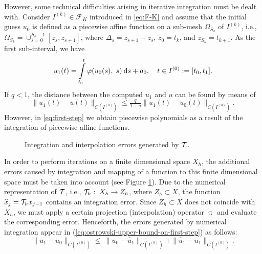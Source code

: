 However, some technical difficulties arising in iterative integration must be dealt 
with. Consider $I^{(k)} \in \mathcal{F}_K$ introduced in \eqref{eq:F-K} and assume that 
the initial guess $u_0$ is defined as a piecewise affine function on a sub-mesh 
$\Omega_{S_k}$ of $I^{(k)}$, i.e., \linebreak 
$\Omega_{S_k} = \cup_{s = 0}^{S_k \minus 1}[z_s, z_{s + 1}]$, where 
$\Delta_s = z_{s + 1} - z_s$, $z_0 = t_k$, and $z_{S_k} = t_{k+1}$. As the first 
sub-interval, we have
%
\begin{equation}
  u_1(t) = \Int_{t_0}^{t} \varphi(u_0(s),\;s) \ds+a_0,\quad t \in I^{(0)} := [t_0, t_1].
  \label{eq:first-step}
\end{equation}
%
If $q < 1$, the distance between the computed $u_1$ and $u$ can be found by means of 
%
\begin{equation}
   \|u_1(t) - u(t)\|_{C(I^{(0)})} \leq \tfrac{q}{1-q} \|u_1(t) - u_0(t)\|_{C(I^{(0)})}.
	\label{eq:ostrowski-upper-bound-on-first-step}
\end{equation}
%
However, in \eqref{eq:first-step} we obtain piecewise polynomials as a result of the 
integration of piecewise affine functions. 
%
\begin{figure}[th]
\begin{center}
	
	\caption{Integration and interpolation errors generated by $\mathcal{T}$.}
	\label{fig:integration-process}
\end{center}
\end{figure}
%
In order to perform iterations on a finite dimensional space $X_h$, the additional 
errors caused by integration and mapping of a function to this finite dimensional space 
must be taken into account (see Figure \ref{fig:integration-process}).
%
Due to the numerical representation of $\mathcal{T}$, i.e., $\mathcal{T}_h:\; X_h \rightarrow Z_h$, 
where $Z_h \subset X$, the function $\widehat{x}_j = \mathcal{T}_h x_{j-1}$ contains an 
integration error. Since $Z_h \subset X$ does not coincide with $X_h$, we must apply a 
certain projection (interpolation) operator $\uppi$ and evaluate the corresponding 
error. 
%
Henceforth, the errors generated by numerical integration appear in
(\ref{eq:ostrowski-upper-bound-on-first-step}) as follows:
%
\begin{equation}
      \|u_1 - u_0\|_{C(I^{(0)})} \leq
            \:\|u_0 - \widehat{u}_1\|_{C(I^{(0)})}
						+ \|\widehat{u}_1 - u_1\|_{C(I^{(0)})}.
 \label{eq:estimate-included-integration-error}
\end{equation}
